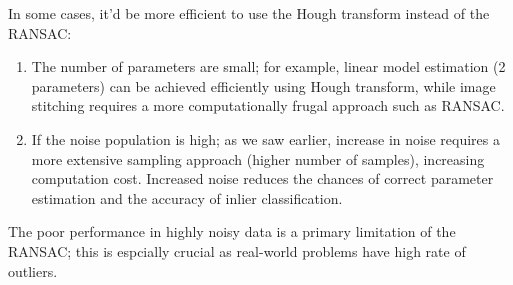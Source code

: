 \documentclass{article}
\begin{document}
In some cases, it'd be more efficient to use the Hough transform instead of the RANSAC:
\begin{enumerate}
  \item The number of parameters are small; for example, linear model estimation (2 parameters) can be achieved efficiently using Hough transform, while image stitching requires a more computationally frugal approach such as RANSAC.
  \item If the noise population is high; as we saw earlier, increase in noise requires a more extensive sampling approach (higher number of samples), increasing computation cost. Increased noise reduces the chances of correct parameter estimation and the accuracy of inlier classification.
\end{enumerate}

The poor performance in highly noisy data is a primary limitation of the RANSAC; this is espcially crucial as real-world problems have high rate of outliers.

\small


\end{document}
